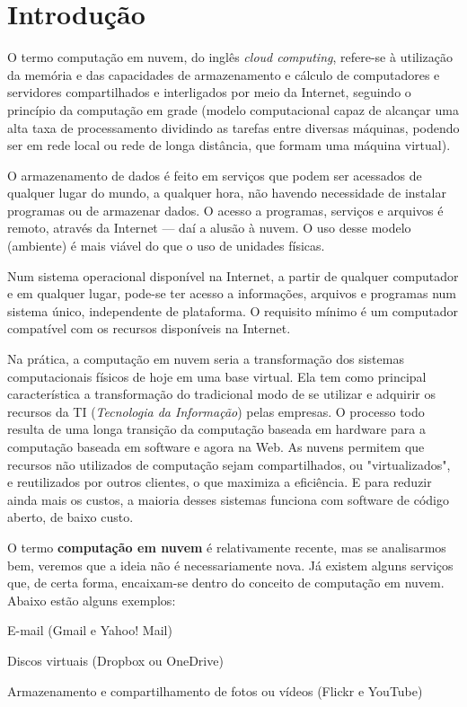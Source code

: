 \section{Introdução}

O termo computação em nuvem, do inglês \emph{cloud computing}, refere-se à
utilização da memória e das capacidades de armazenamento e cálculo de
computadores e servidores compartilhados e interligados por meio da Internet,
seguindo o princípio da computação em grade (modelo computacional capaz de
alcançar uma alta taxa de processamento dividindo as tarefas entre diversas
máquinas, podendo ser em rede local ou rede de longa distância, que formam uma
máquina virtual).

O armazenamento de dados é feito em serviços que podem ser acessados de qualquer
lugar do mundo, a qualquer hora, não havendo necessidade de instalar
programas ou de armazenar dados. O acesso a programas, serviços e arquivos é
remoto, através da Internet --- daí a alusão à nuvem. O uso desse modelo (ambiente)
é mais viável do que o uso de unidades físicas.

Num sistema operacional disponível na Internet, a partir de qualquer computador e em
qualquer lugar, pode-se ter acesso a informações, arquivos e programas num sistema
único, independente de plataforma. O requisito mínimo é um computador compatível
com os recursos disponíveis na Internet.

Na prática, a computação em nuvem seria a transformação dos sistemas
computacionais físicos de hoje em uma base virtual. Ela tem como principal
característica a transformação do tradicional modo de se utilizar e adquirir os
recursos da TI (\emph{Tecnologia da Informação}) pelas empresas. O processo todo
resulta de uma longa transição da computação baseada em hardware para a computação
baseada em software e agora na Web. As nuvens permitem que recursos não utilizados
de computação sejam compartilhados, ou "virtualizados", e reutilizados por outros
clientes, o que maximiza a eficiência. E para reduzir ainda mais os custos, a maioria
desses sistemas funciona com software de código aberto, de baixo custo.

O termo \textbf{computação em nuvem} é relativamente recente, mas se analisarmos bem,
veremos que a ideia não é necessariamente nova. Já existem alguns serviços que,
de certa forma, encaixam-se dentro do conceito de computação em nuvem. Abaixo estão
alguns exemplos:

\begin{itemise}
    \item E-mail (Gmail e Yahoo! Mail)

    \item Discos virtuais (Dropbox ou OneDrive)

    \item Armazenamento e compartilhamento de fotos ou vídeos (Flickr e YouTube)
\end{itemise}
